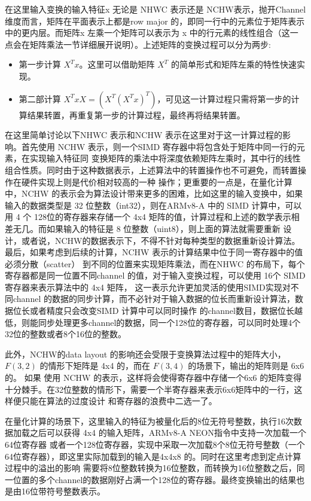 在这里输入变换的输入特征x 无论是 NHWC 表示还是 NCHW表示，抛开Channel 维度而言，矩阵在平面表示上都是row major 的，即同一行中的元素位于矩阵表示中的更内层。而矩阵x
左乘一个矩阵可以表示为 x 中的行元素的线性组合（这一点会在矩阵乘法一节详细展开说明）。上述矩阵的变换过程可以分为两步:

\begin{itemize}
\item 第一步计算 $X^T x $。这里可以借助矩阵 $X^T$ 的简单形式和矩阵左乘的特性快速实现。
\item 第二部计算 $X^T x X = (X^T(X^T x)^T)$，可见这一计算过程只需将第一步的计算结果转置，再重复第一步的计算过程，最终再将结果转置。
\end{itemize}

在这里简单讨论以下NHWC 表示和NCHW 表示在这里对于这一计算过程的影响。首先使用 NCHW 表示，则一个SIMD 寄存器中将包含处于矩阵中同一行的元素，在实现输入特征同
变换矩阵的乘法中将深度依赖矩阵左乘时，其中行的线性组合性质。同时由于这种数据表示，上述算法中的转置操作也不可避免，而转置操作在硬件实现上则是代价相对较高的一种
操作；更重要的一点是，在量化计算中，NCHW 的表示会为算法设计带来更多的困难，比如这里的输入变换中，如果输入的数据类型是 32 位整数（int32），则在ARMv8-A 中的
SIMD 计算中，可以用 4 个 128位的寄存器来存储一个 4x4 矩阵的值，计算过程和上述的数学表示相差无几。而如果输入的特征是 8 位整数（uint8），则上面的算法就需要重新
设计，或者说，NCHW的数据表示下，不得不针对每种类型的数据重新设计算法。最后，如果考虑到后续的计算，NCHW 表示的计算结果中位于同一寄存器中的值必须分散（scatter）
到不同的位置来实现矩阵乘法，而在NHWC 的布局下，每个寄存器都是同一位置不同channel 的值，对于输入变换过程，可以使用  16个 SIMD 寄存器来表示算法中的 4x4 矩阵，
这一表示允许更加灵活的使用SIMD实现对不同channel 的数据的同步计算，而不必针对于输入数据的位长而重新设计算法，数据位长或者精度只会改变SIMD 计算中可以同时操作
的channel数目，数据位长越低，则能同步处理更多channel的数据，同一个128位的寄存器，可以同时处理4个32位的整数或者8个16位的整数。 

此外，NCHW的data layout 的影响还会受限于变换算法过程中的矩阵大小，$F(3, 2)$ 的情形下矩阵是 4x4 的，而在 $F(3, 4)$ 的场景下，输出的矩阵则是 6x6 的。  如果
使用 NCHW 的表示，这样将会使得寄存器中存储一个6x6 的矩阵变得十分棘手。在32位整数的情形下，需要一个半寄存器来表示6x6矩阵中的一行，这样便只能在算法的过度设计
和寄存器的浪费中二选一了。

在量化计算的场景下，这里输入的特征为被量化后的8位无符号整数，执行16次数据加载之后可以获得 4x4 的输入矩阵，ARMv8-A NEON指令中支持一次加载一个64位寄存器
或者一个128位寄存器，实现中采取一次加载8个8位无符号整数（一个64位寄存器），即这里实际加载到的输入是4x4x8 的。同时在这里考虑到定点计算过程中的溢出的影响
需要将8位整数转换为16位整数，而转换为16位整数之后，同一位置的多个channel的数据刚好占满一个128位的寄存器。最终变换输出的结果也是由16位带符号整数表示。

